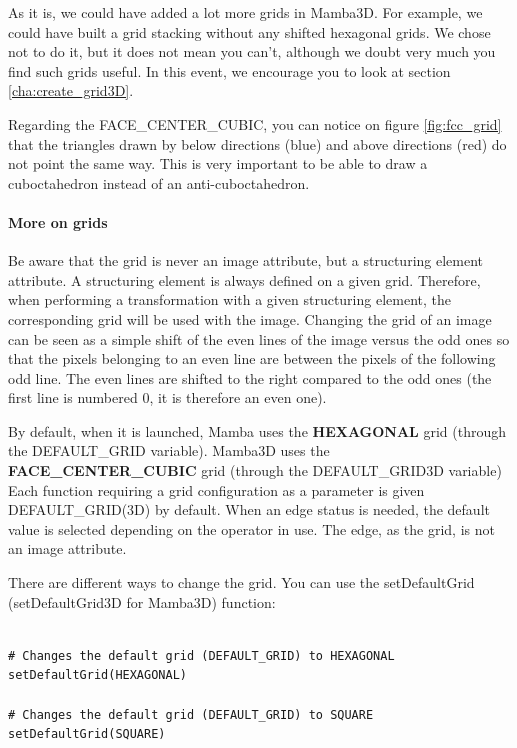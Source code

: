 \documentclass[a4paper,10pt,oneside]{article}
\begin{document}
As it is, we could have added a lot more grids in Mamba3D. For example,
we could have built a grid stacking without any shifted hexagonal grids.
We chose not to do it, but it does not mean you can't, although we doubt very
much you find such grids useful. In this event, we encourage you to look
at section \ref{cha:create_grid3D}.

Regarding the FACE\_CENTER\_CUBIC, you can notice on figure \ref{fig:fcc_grid}
that the triangles drawn by below directions (blue) and above directions (red)
do not point the same way. This is very important to be able to draw a 
cuboctahedron instead of an anti-cuboctahedron.

\paragraph{More on grids}

Be aware that the grid is never an image attribute, but a structuring element 
attribute. A structuring element is always defined on a given grid. Therefore, 
when performing a transformation with a given structuring element, the corresponding 
grid will be used with the image. Changing the grid of an image can be seen as a 
simple shift of the even lines of the image versus the odd ones so that the pixels 
belonging to an even line are between the pixels of the following odd line. The even 
lines are shifted to the right compared to the odd ones (the first line is numbered 0, 
it is therefore an even one).

By default, when it is launched, Mamba uses the \textbf{HEXAGONAL} grid (through 
the DEFAULT\_GRID variable). Mamba3D uses the \textbf{FACE\_CENTER\_CUBIC} grid
(through the DEFAULT\_GRID3D variable)  Each function requiring a grid
configuration as a parameter is given DEFAULT\_GRID(3D) by default. When an
edge status is needed, the default value is selected depending on the operator
in use. The edge, as the grid, is not an image attribute.

There are different ways to change the grid. You can use the setDefaultGrid 
(setDefaultGrid3D for Mamba3D) function:

\lstset{language=Python}
\begin{lstlisting}

# Changes the default grid (DEFAULT_GRID) to HEXAGONAL
setDefaultGrid(HEXAGONAL)

# Changes the default grid (DEFAULT_GRID) to SQUARE
setDefaultGrid(SQUARE)
\end{lstlisting}
\end{document}
